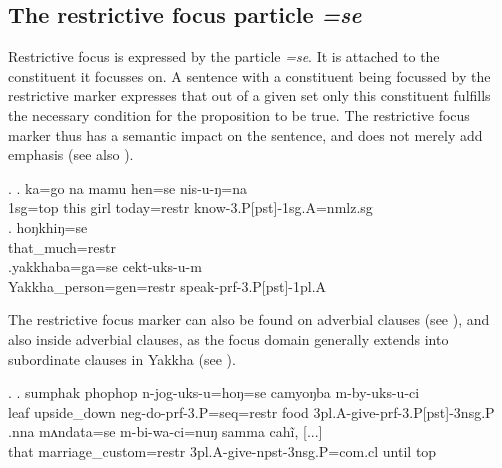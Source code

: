 \subsection{The restrictive focus particle \emph{=se}}
		
Restrictive focus is expressed by the particle \emph{=se}. It is attached to the constituent it focusses on. A sentence with a constituent being focussed by the restrictive marker  expresses that out of a given  set only this constituent fulfills the necessary condition for the proposition to be true. The restrictive focus marker thus has a semantic impact on the sentence, and does not merely add emphasis (see also \citealt{Koenig1993_Focus}). 

\ex. \ag. ka=go na mamu hen=se nis-u-ŋ=na\\
	 	{\sc 1sg=top} this girl today{\sc=restr} know{\sc -3.P[pst]-1sg.A=nmlz.sg}\\
	 	\bg.  hoŋkhiŋ=se\\
	 	that\_much{\sc=restr}\\
		\bg.yakkhaba=ga=se       cekt-uks-u-m\\
		Yakkha\_person{\sc =gen=restr} speak{\sc -prf-3.P[pst]-1pl.A}\\
		 
		

The restrictive focus  marker can also be found on adverbial clauses (see \Next[a]), and also inside adverbial clauses, as the focus domain generally extends into subordinate clauses in Yakkha (see \Next[b]).

 \ex. \ag. sumphak phophop     n-jog-uks-u=hoŋ=se                             camyoŋba m-by-uks-u-ci\\
 leaf upside\_down {\sc neg-}do{\sc -prf-3.P=seq=restr} food {\sc 3pl.A-}give{\sc -prf-3.P[pst]-3nsg.P}\\
 \bg.nna  mʌndata=se                     m-bi-wa-ci=nuŋ                    samma cahĩ,  [...]\\
 that marriage\_custom{\sc =restr} {\sc 3pl.A-}give{\sc -npst-3nsg.P=com.cl} until {\sc top}\\
   
 
